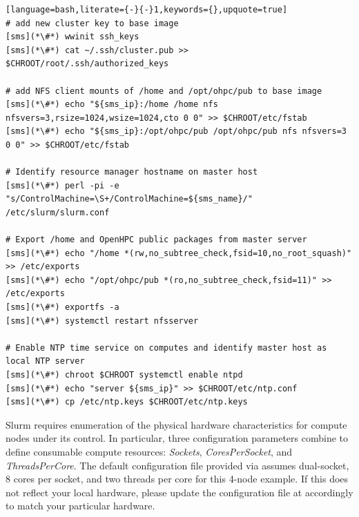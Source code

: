 \documentclass[letterpaper]{article}
\begin{document}
\begin{lstlisting}[language=bash,literate={-}{-}1,keywords={},upquote=true]
# add new cluster key to base image
[sms](*\#*) wwinit ssh_keys
[sms](*\#*) cat ~/.ssh/cluster.pub >> $CHROOT/root/.ssh/authorized_keys

# add NFS client mounts of /home and /opt/ohpc/pub to base image
[sms](*\#*) echo "${sms_ip}:/home /home nfs nfsvers=3,rsize=1024,wsize=1024,cto 0 0" >> $CHROOT/etc/fstab
[sms](*\#*) echo "${sms_ip}:/opt/ohpc/pub /opt/ohpc/pub nfs nfsvers=3 0 0" >> $CHROOT/etc/fstab

# Identify resource manager hostname on master host
[sms](*\#*) perl -pi -e "s/ControlMachine=\S+/ControlMachine=${sms_name}/" /etc/slurm/slurm.conf

# Export /home and OpenHPC public packages from master server
[sms](*\#*) echo "/home *(rw,no_subtree_check,fsid=10,no_root_squash)" >> /etc/exports
[sms](*\#*) echo "/opt/ohpc/pub *(ro,no_subtree_check,fsid=11)" >> /etc/exports
[sms](*\#*) exportfs -a
[sms](*\#*) systemctl restart nfsserver

# Enable NTP time service on computes and identify master host as local NTP server
[sms](*\#*) chroot $CHROOT systemctl enable ntpd
[sms](*\#*) echo "server ${sms_ip}" >> $CHROOT/etc/ntp.conf
[sms](*\#*) cp /etc/ntp.keys $CHROOT/etc/ntp.keys

\end{lstlisting}


\begin{center}
\begin{tcolorbox}[]
  \small Slurm requires enumeration of the physical hardware characteristics
  for compute nodes under its control. In particular, three configuration
  parameters combine to define consumable compute resources: {\em Sockets},
  {\em CoresPerSocket}, and {\em ThreadsPerCore}. The default configuration
  file provided via \OHPC{} assumes dual-socket, 8 cores per socket, and two
  threads per core for this 4-node example. If this does not reflect your local
  hardware, please update the configuration file at
   accordingly to match your particular hardware.
\end{tcolorbox}
\end{center}


\end{document}
